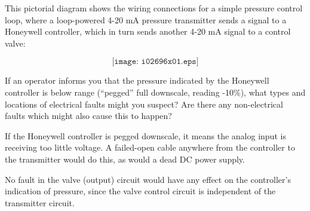

This pictorial diagram shows the wiring connections for a simple pressure control loop, where a loop-powered 4-20 mA pressure transmitter sends a signal to a Honeywell controller, which in turn sends another 4-20 mA signal to a control valve:

$$\texttt{[image: i02696x01.eps]}$$

If an operator informs you that the pressure indicated by the Honeywell controller is below range (``pegged'' full downscale, reading -10\%), what types and locations of electrical faults might you suspect?  Are there any non-electrical faults which might also cause this to happen?








If the Honeywell controller is pegged downscale, it means the analog input is receiving too little voltage.  A failed-open cable anywhere from the controller to the transmitter would do this, as would a dead DC power supply.
 
\vskip 10pt

No fault in the valve (output) circuit would have any effect on the controller's indication of pressure, since the valve control circuit is independent of the transmitter circuit.












